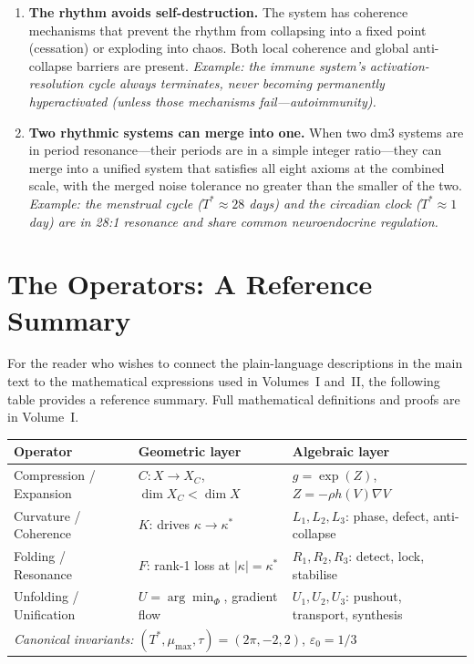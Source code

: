 \documentclass[12pt, oneside]{book}
\theoremstyle{plain}
\theoremstyle{definition}
\theoremstyle{remark}
\begin{document}
\begin{enumerate}[label=\textbf{Axiom \arabic*.}]
  \item \textbf{The rhythm avoids self-destruction.}
    The system has coherence mechanisms that prevent the rhythm
    from collapsing into a fixed point (cessation) or exploding
    into chaos. Both local coherence and global anti-collapse
    barriers are present.
    \emph{Example: the immune system's activation-resolution
    cycle always terminates, never becoming permanently
    hyperactivated (unless those mechanisms fail---autoimmunity).}

  \item \textbf{Two rhythmic systems can merge into one.}
    When two dm3 systems are in period resonance---their
    periods are in a simple integer ratio---they can merge
    into a unified system that satisfies all eight axioms
    at the combined scale, with the merged noise tolerance
    no greater than the smaller of the two.
    \emph{Example: the menstrual cycle ($T^* \approx 28$ days)
    and the circadian clock ($T^* \approx 1$ day) are in
    28:1 resonance and share common neuroendocrine regulation.}

\end{enumerate}

\chapter{The Operators: A Reference Summary}
\label{app:operators}

For the reader who wishes to connect the plain-language
descriptions in the main text to the mathematical expressions
used in Volumes~I and~II, the following table provides a
reference summary. Full mathematical definitions and proofs
are in Volume~I.

\begin{center}
\begin{tabular}{lll}
\textbf{Operator} & \textbf{Geometric layer} & \textbf{Algebraic layer} \\
\hline
Compression / Expansion & $C: X \to X_C$,
  $\dim X_C < \dim X$ & $g = \exp(Z)$, $Z = -\rho h(V) \nabla V$ \\
Curvature / Coherence & $K$: drives $\kappa \to \kappa^*$ &
  $L_1, L_2, L_3$: phase, defect, anti-collapse \\
Folding / Resonance & $F$: rank-1 loss at $|\kappa| = \kappa^*$ &
  $R_1, R_2, R_3$: detect, lock, stabilise \\
Unfolding / Unification & $U = \arg\min_\Phi$, gradient flow &
  $U_1, U_2, U_3$: pushout, transport, synthesis \\
\hline
\multicolumn{3}{l}{\textit{Canonical invariants:}
  $(T^*, \mu_{\max}, \tau) = (2\pi, -2, 2)$,
  $\varepsilon_0 = 1/3$} \\
\end{tabular}
\end{center}
\end{document}

